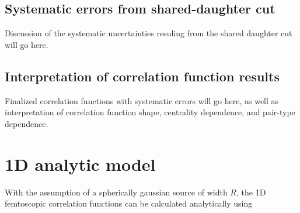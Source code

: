 \subsection{Systematic errors from shared-daughter cut}

Discussion of the systematic uncertainties resuling from the shared daughter cut will go here.

\subsection{Interpretation of correlation function results}
\label{sec:CFInterpretation}

Finalized correlation functions with systematic errors will go here, as well as interpretation of correlation function shape, centrality dependence, and pair-type dependence.  

\section{1D analytic model}
\label{sec:AnalyticModel}
With the assumption of a spherically gaussian source of width $R$, the 1D femtoscopic correlation functions can be calculated analytically \cite{lednicky82} using 

